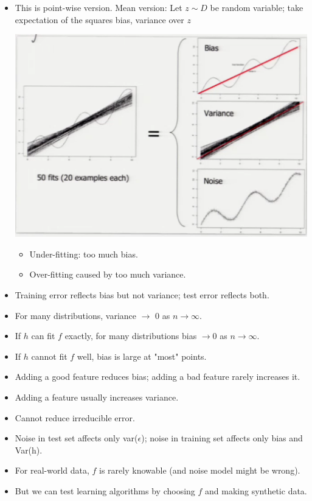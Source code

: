 \documentclass[10pt]{article}
\begin{document}
\begin{description}
\begin{itemize}
			\item This is point-wise version. Mean version: Let $z \sim D$ be random variable; take expectation of the squares bias, variance over $z$
				\begin{center}
					\includegraphics[scale=0.5]{images/noise}
				\end{center}
				\begin{itemize}
					\item Under-fitting: too much bias.
					\item Over-fitting caused by too much variance. 
				\end{itemize}
			\item Training error reflects bias but not variance; test error reflects both.
			\item For many distributions, variance $\rightarrow$ 0 as $n \rightarrow \infty$.
			\item If $h$ can fit $f$ exactly, for many distributions bias $\rightarrow 0$ as $n \rightarrow \infty$.
			\item If $h$ cannot fit $f$ well, bias is large at "most" points.
			\item Adding a good feature reduces bias; adding a bad feature rarely increases it.
			\item Adding a feature usually increases variance.
			\item Cannot reduce irreducible error.
			\item Noise in test set affects only var($\epsilon$); noise in training set affects only bias and Var(h).
			\item For real-world data, $f$ is rarely knowable (and noise model might be wrong).
			\item But we can test learning algorithms by choosing $f$ and making synthetic data.

\end{itemize}
\end{description}
\end{document}
